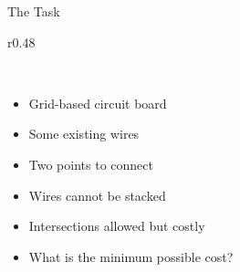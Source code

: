 \documentclass[aspectratio=169,xcolor=dvipsnames, t]{beamer}
\def\circbwirelinewidth{1mm}
\begin{document}
\begin{frame}{The Task}
\begin{wrapfigure}{r}{0.48\textwidth}
    \end{wrapfigure}
    \ %
    \begin{itemize}
        \item Grid-based circuit board
        \item Some existing wires
        \item Two points to connect
        \item Wires cannot be stacked
        \item Intersections allowed but costly
        \item What is the minimum possible cost?
    \end{itemize}
\end{frame}
\end{document}
